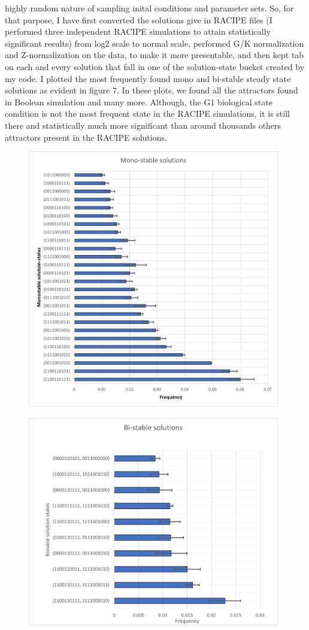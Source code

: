 \documentclass{article}
\begin{document}
highly random nature of sampling inital conditions and parameter sets. So, for 
that purpose, I have first converted the solutions give in RACIPE files 
(I performed three independent RACIPE simulations to attain statistically 
significant results) from 
log2 scale to normal scale, performed G/K normalization and Z-normalization on 
the data, to make it more presentable, and then kept tab on each and every solution
that fall in one of the solution-state bucket created by my code. I plotted 
the most frequently found mono and bi-stable steady state solutions as evident 
in figure 7. In these plots, we found all the attractors found in Boolean simulation
and many more. Although, the G1 biological state condition is not the most frequent 
state in the RACIPE simulations, it is still there and statistically much more significant 
than around thousands others attractors present in the RACIPE solutions.
\begin{figure}[H]
  \centering
  \includegraphics[width=110mm, scale=0.5]{monostable-freq.png}
\end{figure}
\begin{figure}[H]
  \centering
  \includegraphics[width=110mm, scale=0.5]{bistable-freq.png}
   \\
\end{figure}
\end{document}
